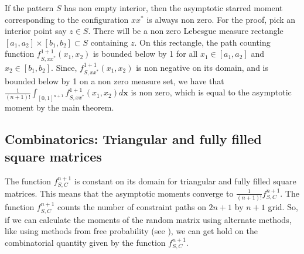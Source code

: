 \documentclass[12pt]{amsart}
\theoremstyle{definition}
\theoremstyle{remark}
\begin{document}
If the pattern $S$ has non empty interior, then the asymptotic starred moment corresponding to the configuration $xx^*$ is always non zero. For the proof, pick an interior point say $z \in S$. There will be a non zero Lebesgue measure rectangle  $[a_1,a_2] \times [b_1,b_2] \subset S$ containing $z$. On this rectangle, the path counting function $f_{S,xx^*}^{1+1}(x_1,x_2)$ is bounded below by 1 for all $x_1\in [a_1,a_2]$ and $x_2 \in [b_1,b_2]$. Since, $f_{S,xx^*}^{1+1}(x_1,x_2)$ is non negative on its domain, and is bounded below by 1 on a non zero measure set, we have that  $\frac{1}{(n+1)!}\int_{[0,1]^{n+1}}f_{S,xx^*}^{1+1}(x_1,x_2)d\mathbf{x}$ is non zero, which is equal to the asymptotic moment by the main theorem.



    
\subsection{Combinatorics: Triangular and fully filled square matrices}

The function $f_{S,C}^{n+1}$ is constant on its domain for triangular and fully filled square matrices. This means that the asymptotic moments converge to 
$\frac{1}{(n+1)!}f_{S,C}^{n+1}$. The function $f_{S,C}^{n+1}$ counts the number of constraint paths on $2n+1$ by $n+1$ grid. So, if we can calculate the moments of the random matrix using alternate methods, like using methods from free probability (see \cite{dykema}), we can get hold on the combinatorial quantity given by the function $f_{S,C}^{n+1}$. \\
\end{document}
